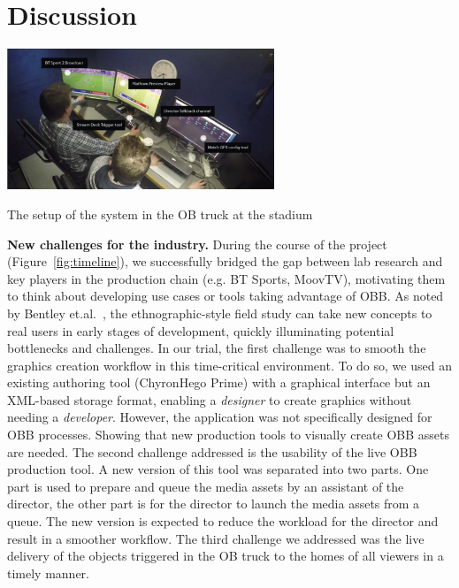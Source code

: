 \documentclass[sigchi-a, authorversion]{acmart}
\begin{document}
\section{Discussion}

\begin{marginfigure}
    \vspace{-8pc}
    \hspace*{-1cm}
    \includegraphics[width=8cm]{Figures/liveproduction.jpg}
    \caption{The setup of the system in the OB truck at the stadium}
    \label{fig:liveproduction}
\end{marginfigure}

\textbf{New challenges for the industry.} During the course of the project
(Figure~\ref{fig:timeline}), we successfully bridged the gap between lab
research and key players in the production chain (e.g. BT Sports, MoovTV),
motivating them to think about developing use cases or tools taking advantage of
OBB\@. As noted by Bentley et.al.~\cite{bentley2009}, the ethnographic-style
field study can take new concepts to real users in early stages of development,
quickly illuminating potential bottlenecks and challenges. In our trial, the
first challenge was to smooth the graphics creation workflow in this
time-critical environment. To do so, we used an existing authoring tool
(ChyronHego Prime) with a graphical interface but an XML-based storage format,
enabling a \textit{designer} to create graphics without needing a
\textit{developer}. However, the application was not specifically designed for
OBB processes. Showing that new production tools to visually create OBB assets are needed.
The second challenge addressed is the usability of the live OBB production
tool. A new version of this tool was separated into two parts. One part is
used to prepare and queue the media assets by an assistant of the director, the
other part is for the director to launch the media assets from a queue. The new
version is expected to reduce the workload for the director and result in a
smoother workflow. The third challenge we addressed was the live delivery of
the objects triggered in the OB truck to the homes of all viewers in a timely
manner.
\end{document}
